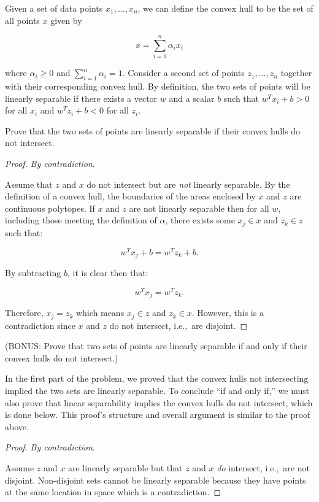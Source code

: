 \begin{problem}
Given a set of data points $x_1,\ldots,x_n$, we can define the convex hull to be the set of all points $x$ given by

\[x = \sum_{i=1}^{n} \alpha_i x_i \]

\noindent
where $\alpha_{i} \geq 0$ and $\sum_{i=1}^{n} \alpha_i = 1$. Consider a second set of points $z_1,\ldots,z_n$ together with their corresponding convex hull. By definition, the two sets of points will be linearly separable if there exists a vector $w$ and a scalar $b$ such that $w^{T}x_i + b > 0$ for all $x_i$ and $w^{T}z_i + b < 0$ for all $z_i$.

Prove that the two sets of points are linearly separable if their convex hulls do not intersect.
\end{problem}

\begin{proof}
  \textit{By contradiction}.

  Assume that $z$ and $x$ do not intersect but are \textit{not} linearly separable.  By the definition of a convex hull, the boundaries of the areas enclosed by $x$ and $z$ are continuous polytopes.  If $x$ and $z$ are not linearly separable then for all $w$, including those meeting the definition of $\alpha$, there exists some $x_j \in x$ and $z_k \in z$ such that:

  \[w^{T}x_j + b = w^{T}z_k +b \text{.} \]

\noindent
By subtracting $b$, it is clear then that:

\[w^{T}x_j  = w^{T}z_k \text{.} \]

\noindent
Therefore, $x_j = z_k$ which means $x_j\in z$ and $z_k \in x$.  However, this is a contradiction since $x$ and $z$ do not intersect, i.e.,~are disjoint.

\end{proof}

\begin{subproblem}
  (BONUS\@: Prove that two sets of points are linearly separable if and only if their convex hulls do not intersect.)
\end{subproblem}

In the first part of the problem, we proved that the convex hulls not intersecting implied the two sets are linearly separable.  To conclude ``if and only if,'' we must also prove that linear separability implies the convex hulls do not intersect, which is done below.  This proof's structure and overall argument is similar to the proof above.

\begin{proof}
  \textit{By contradiction}.

  Assume $z$ and $x$ are linearly separable but that $z$ and $x$ \textit{do} intersect, i.e.,~are not disjoint.  Non-disjoint sets cannot be linearly separable because they have points at the same location in space which is a contradiction.
\end{proof}
